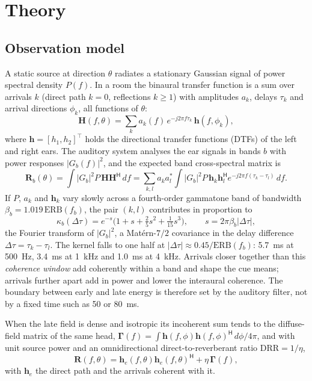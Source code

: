 \documentclass[11pt]{article}
\begin{document}
\section{Theory}\label{sec:theory}

\subsection{Observation model}
A static source at direction $\theta$ radiates a stationary Gaussian signal of power spectral density $P(f)$. In a room the binaural transfer function is a sum over arrivals $k$ (direct path $k=0$, reflections $k\ge1$) with amplitudes $a_k$, delays $\tau_k$ and arrival directions $\phi_k$, all functions of $\theta$:
\begin{equation}
\bm H(f,\theta)=\sum_k a_k(f)\,e^{-j2\pi f\tau_k}\,\bm h(f,\phi_k),
\end{equation}
where $\bm h=[h_1,h_2]^{\top}$ holds the directional transfer functions (DTFs) of the left and right ears. The auditory system analyses the ear signals in bands $b$ with power responses $|G_b(f)|^2$, and the expected band cross-spectral matrix is
\begin{equation}
\bm R_b(\theta)=\int |G_b|^2 P\,\bm H\bm H^{\mathsf H}\,df=\sum_{k,l}a_ka_l^{*}\int|G_b|^2P\,\bm h_k\bm h_l^{\mathsf H}e^{-j2\pi f(\tau_k-\tau_l)}\,df.
\end{equation}
If $P$, $a_k$ and $\bm h_k$ vary slowly across a fourth-order gammatone band of bandwidth $\beta_b=1.019\,\mathrm{ERB}(f_b)$, the pair $(k,l)$ contributes in proportion to
\begin{equation}
\kappa_b(\Delta\tau)=e^{-s}\big(1+s+\tfrac25s^2+\tfrac1{15}s^3\big),\qquad s=2\pi\beta_b|\Delta\tau|,
\end{equation}
the Fourier transform of $|G_b|^2$, a Mat\'ern-$7/2$ covariance in the delay difference $\Delta\tau=\tau_k-\tau_l$. The kernel falls to one half at $|\Delta\tau|\approx0.45/\mathrm{ERB}(f_b)$: 5.7~ms at 500~Hz, 3.4~ms at 1~kHz and 1.0~ms at 4~kHz. Arrivals closer together than this \emph{coherence window} add coherently within a band and shape the cue means; arrivals further apart add in power and lower the interaural coherence. The boundary between early and late energy is therefore set by the auditory filter, not by a fixed time such as 50 or 80~ms.

When the late field is dense and isotropic its incoherent sum tends to the diffuse-field matrix of the same head, $\bm\Gamma(f)=\int\bm h(f,\phi)\bm h(f,\phi)^{\mathsf H}\,d\phi/4\pi$, and with unit source power and an omnidirectional direct-to-reverberant ratio $\mathrm{DRR}=1/\eta$,
\begin{equation}
\bm R(f,\theta)=\bm h_e(f,\theta)\bm h_e(f,\theta)^{\mathsf H}+\eta\,\bm\Gamma(f),
\label{eq:R}
\end{equation}
with $\bm h_e$ the direct path and the arrivals coherent with it.
\end{document}
